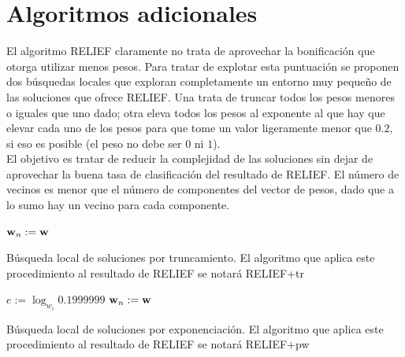 \documentclass{article}
\newenvironment{algo}{
	\vspace*{0.5cm}
	\begin{algorithm}[H]}{
	\end{algorithm}
	\vspace*{0.5cm}
}
\begin{document}
\section{Algoritmos adicionales}

El algoritmo RELIEF claramente no trata de aprovechar la bonificación que otorga utilizar menos pesos. Para tratar de explotar esta puntuación se proponen dos búsquedas locales que exploran completamente un entorno muy pequeño de las soluciones que ofrece RELIEF. Una trata de truncar todos los pesos menores o iguales que uno dado; otra eleva todos los pesos al exponente al que hay que elevar cada uno de los pesos para que tome un valor ligeramente menor que $0.2$, si eso es posible (el peso no debe ser $0$ ni $1$). \\

El objetivo es tratar de reducir la complejidad de las soluciones sin dejar de aprovechar la buena tasa de clasificación del resultado de RELIEF. El número de vecinos es menor que el número de componentes del vector de pesos, dado que a lo sumo hay un vecino para cada componente. \\

\begin{algo}

	$\normalfont \textbf w_n := \normalfont \textbf w$\;
	\vspace{0.2cm}
	\caption{Búsqueda local de soluciones por truncamiento. El algoritmo que aplica este procedimiento al resultado de RELIEF se notará RELIEF+tr}
\end{algo}

\begin{algo}
	
	$e := \log_{w_i}{0.1999999}$\;
	$\normalfont \textbf w_n := \normalfont \textbf w$\;
	\vspace{0.2cm}
	\caption{Búsqueda local de soluciones por exponenciación. El algoritmo que aplica este procedimiento al resultado de RELIEF se notará RELIEF+pw}
\end{algo}
\end{document}
